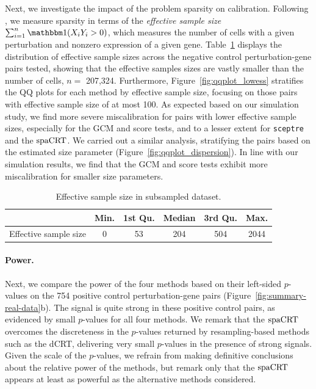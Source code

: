 \documentclass[12pt]{article}
\theoremstyle{definition}
\newcommand{\indicator}{\mathbbm 1}						%
\newcommand{\spacrt}{\textnormal{spaCRT}}               %
\begin{document}
  Next, we investigate the impact of the problem sparsity on calibration. Following \citep{Barry2024}, we measure sparsity in terms of the \textit{effective sample size} $\sum_{i = 1}^n \indicator(X_{i} Y_{i} > 0)$, which measures the number of cells with a given perturbation and nonzero expression of a given gene. Table~\ref{tab:sparsity_level_ess} displays the distribution of effective sample sizes across the negative control perturbation-gene pairs tested, showing that the effective samples sizes are vastly smaller than the number of cells, $n =$ 207,324. Furthermore, Figure~\ref{fig:qqplot_lowess} stratifies the QQ plots for each method by effective sample size, focusing on those pairs with effective sample size of at most 100. As expected based on our simulation study, we find more severe miscalibration for pairs with lower effective sample sizes, especially for the GCM and score tests, and to a lesser extent for \verb|sceptre| and the $\spacrt$. We carried out a similar analysis, stratifying the pairs based on the estimated size parameter (Figure~\ref{fig:qqplot_dispersion}). In line with our simulation results, we find that the GCM and score tests exhibit more miscalibration for smaller size parameters. 
  
  \begin{table}[h!]
	\centering
	\begin{tabular}[t]{lccccc}
	\toprule
	  & Min. & 1st Qu. & Median & 3rd Qu. & Max.\\
	\midrule
	Effective sample size & 0   &   53   &  204  &   504  & 2044 \\
	\bottomrule
	\end{tabular}
	\caption{Effective sample size in subsampled dataset.}
	\label{tab:sparsity_level_ess}
  \end{table}
  
  \paragraph{Power.}
  
  Next, we compare the power of the four methods based on their left-sided $p$-values on the 754 positive control perturbation-gene pairs (Figure~\ref{fig:summary-real-data}b). The signal is quite strong in these positive control pairs, as evidenced by small $p$-values for all four methods. We remark that the $\spacrt$ overcomes the discreteness in the $p$-values returned by resampling-based methods such as the dCRT, delivering very small $p$-values in the presence of strong signals. Given the scale of the $p$-values, we refrain from making definitive conclusions about the relative power of the methods, but remark only that the $\spacrt$ appears at least as powerful as the alternative methods considered.
  
\end{document}

